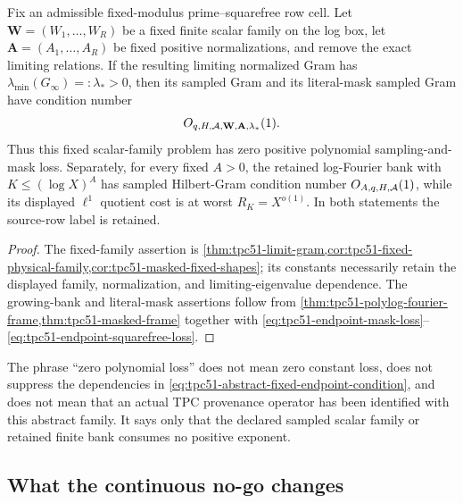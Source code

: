 \begin{corollary}
\label{cor:tpc51-endpoint-quotient-stability}
Fix an admissible fixed-modulus prime--squarefree row cell.  Let
\(\mathbf W=(W_1,\ldots,W_R)\) be a fixed finite scalar family on the
log box, let \(\mathbf A=(A_1,\ldots,A_R)\) be fixed positive
normalizations, and remove the exact limiting relations.  If the
resulting limiting normalized Gram has
\(\lambda_{\min}(G_\infty)=:\lambda_*>0\), then its sampled Gram and its
literal-mask sampled Gram have condition number
\begin{equation}
 O_{q,H,\mathcal A,\mathbf W,\mathbf A,\lambda_*}(1).
 \label{eq:tpc51-abstract-fixed-endpoint-condition}
\end{equation}
Thus this fixed scalar-family problem has zero positive polynomial
sampling-and-mask loss.  Separately, for every fixed \(A>0\), the
retained log-Fourier bank with \(K\leq(\log X)^A\) has sampled
Hilbert-Gram condition number
\(O_{A,q,H,\mathcal A}(1)\), while its displayed \(\ell^1\) quotient cost is at
worst \(R_K=X^{o(1)}\).  In both statements the source-row label is
retained.
\end{corollary}

\begin{proof}
The fixed-family assertion is
\cref{thm:tpc51-limit-gram,cor:tpc51-fixed-physical-family,cor:tpc51-masked-fixed-shapes};
its constants necessarily retain the
displayed family, normalization, and limiting-eigenvalue dependence.
The growing-bank and literal-mask assertions follow from
\cref{thm:tpc51-polylog-fourier-frame,thm:tpc51-masked-frame} together
with \eqref{eq:tpc51-endpoint-mask-loss}--
\eqref{eq:tpc51-endpoint-squarefree-loss}.
\end{proof}

The phrase ``zero polynomial loss'' does not mean zero constant loss,
does not suppress the dependencies in
\eqref{eq:tpc51-abstract-fixed-endpoint-condition}, and does not mean
that an actual TPC provenance operator has been identified with this
abstract family.  It says only that the declared sampled scalar family
or retained finite bank consumes no positive exponent.

\subsection{What the continuous no-go changes}

